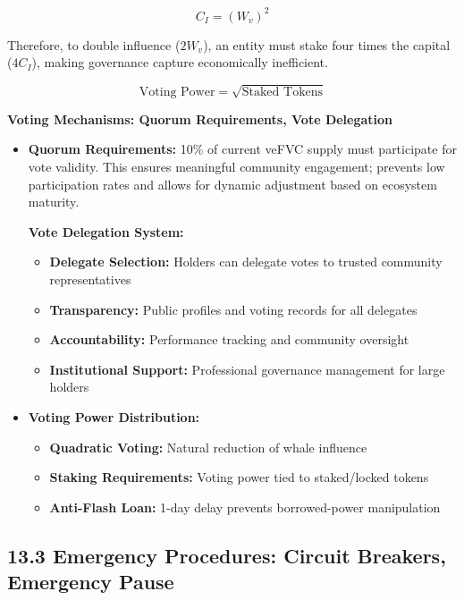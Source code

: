 \documentclass[
  paper=a4,
  ,captions=tableheading
]{scrartcl}
\providecommand{\tightlist}{%
  \setlength{\itemsep}{0pt}\setlength{\parskip}{0pt}}
\begin{document}
\[
C_I = (W_v)^2
\]

Therefore, to double influence ($2W_v$), an entity must stake four times the capital ($4C_I$), making governance capture economically inefficient.

\[
\text{Voting Power} = \sqrt{\text{Staked Tokens}}
\]

\textbf{Voting Mechanisms: Quorum Requirements, Vote
Delegation}\label{voting-mechanisms-quorum-requirements-vote-delegation}

\begin{itemize}
\tightlist
\item
  \textbf{Quorum Requirements:} 10\% of current veFVC supply must
  participate for vote validity. This ensures meaningful community engagement; prevents low participation rates and allows for dynamic adjustment based on ecosystem maturity.

  \textbf{Vote Delegation System:}

  \begin{itemize}
  \tightlist
  \item
    \textbf{Delegate Selection:} Holders can delegate votes to trusted
    community representatives
  \item
    \textbf{Transparency:} Public profiles and voting records for all
    delegates
  \item
    \textbf{Accountability:} Performance tracking and community
    oversight
  \item
    \textbf{Institutional Support:} Professional governance management
    for large holders
  \end{itemize}
\item
  \textbf{Voting Power Distribution:}

  \begin{itemize}
  \tightlist
  \item
    \textbf{Quadratic Voting:} Natural reduction of whale influence
  \item
    \textbf{Staking Requirements:} Voting power tied to staked/locked
    tokens
  \item
    \textbf{Anti-Flash Loan:} 1-day delay prevents borrowed-power
    manipulation
  \end{itemize}
\end{itemize}

\subsection{13.3 Emergency Procedures: Circuit Breakers, Emergency
Pause}\label{emergency-procedures-circuit-breakers-emergency-pause}
\end{document}
